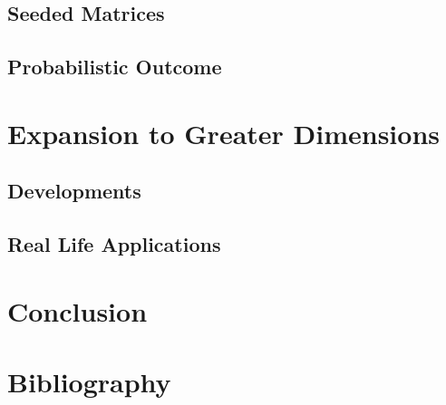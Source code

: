 \documentclass[12pt]{article}
\begin{document}
\subsection{Seeded Matrices}
\subsection{Probabilistic Outcome}

\section{Expansion to Greater Dimensions}
\subsection{Developments}
\subsection{Real Life Applications}

\section{Conclusion}
\section{Bibliography}
\end{document}
